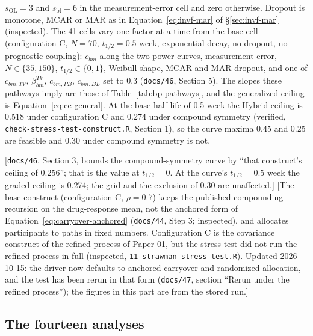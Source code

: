 \documentclass[11pt]{article}
\newcommand{\note}[1]{\textcolor{blue!60!black}{\small [#1]}}
\newcommand{\code}[1]{\texttt{#1}}
\begin{document}
$s_{\mathrm{OL}} = 3$ and $s_{\mathrm{bl}} = 6$ in the measurement-error
cell and zero otherwise. Dropout is monotone, MCAR or MAR as in
Equation~\eqref{eq:invf-mar} of \S\ref{sec:invf-mar} (inspected). The
41 cells vary one factor at a time from the base cell
(configuration C, $N = 70$, $t_{1/2} = 0.5$ week, exponential decay,
no dropout, no prognostic coupling): $c_{bm}$ along the two power
curves, measurement error, $N \in \{35, 150\}$, $t_{1/2} \in \{0, 1\}$,
Weibull shape, MCAR and MAR dropout, and one of $c_{bm,TV}$,
$\beta^{TV}_{bm}$, $c_{bm,PB}$, $c_{bm,BL}$ set to 0.3 (\code{docs/46},
Section 5). The slopes these pathways imply are those of
Table~\ref{tab:bp-pathways}, and the generalized ceiling is
Equation~\eqref{eq:ce-general}. At the base half-life of 0.5 week the
Hybrid ceiling is 0.518 under configuration C and 0.274 under compound
symmetry (verified, \code{check-stress-test-construct.R}, Section 1), so the curve
maxima 0.45 and 0.25 are feasible and 0.30 under compound symmetry is
not.

\note{\code{docs/46}, Section 3, bounds the compound-symmetry curve by
``that construct's ceiling of 0.256''; that is the value at
$t_{1/2} = 0$. At the curve's $t_{1/2} = 0.5$ week the graded ceiling
is 0.274; the grid and the exclusion of 0.30 are unaffected.}
\note{The base construct (configuration C, $\rho = 0.7$) keeps the
published compounding recursion on the drug-response mean, not the
anchored form of Equation~\eqref{eq:carryover-anchored}
(\code{docs/44}, Step 3; inspected), and allocates participants to
paths in fixed numbers. Configuration C is the covariance construct of
the refined process of Paper 01, but the stress test did not run the
refined process in full (inspected, \code{11-strawman-stress-test.R}).
Updated 2026-10-15: the driver now defaults to anchored carryover and
randomized allocation, and the test has been rerun in that form
(\code{docs/47}, section ``Rerun under the refined process''); the
figures in this part are from the stored run.}

\subsection{The fourteen analyses}
\label{sec:invd-analyses}
\end{document}
